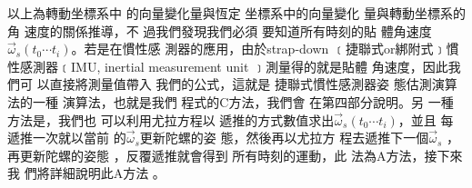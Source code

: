 \documentclass[12pt,twoside]{article}
\begin{document}
\bigskip

以上為轉動坐標系中%
的向量變化量與恆定%
坐標系中的向量變化%
量與轉動坐標系的角%
速度的關係推導，不%
過我們發現我們必須%
要知道所有時刻的貼%
體角速度$\vec{\omega}_{s}\left( t_{0}\cdots
t_{i}\right) $。若是在慣性感%
測器的應用，由於strap-down%
﹝捷聯式or綁附式﹞慣%
性感測器﹝IMU, inertial measurement unit%
﹞測量得的就是貼體%
角速度，因此我們可%
以直接將測量值帶入%
我們的公式，這就是%
捷聯式慣性感測器姿%
態估測演算法的一種%
演算法，也就是我們%
程式的C方法，我們會%
在第四部分說明。另%
一種方法是，我們也%
可以利用尤拉方程以%
遞推的方式數值求出$%
\vec{\omega}_{s}\left( t_{0}\cdots t_{i}\right) $，並且%
每遞推一次就以當前%
的$\vec{\omega}_{s}$更新陀螺的姿%
態，然後再以尤拉方%
程去遞推下一個$\vec{\omega}_{s}$%
，再更新陀螺的姿態%
，反覆遞推就會得到%
所有時刻的運動，此%
法為A方法，接下來我%
們將詳細說明此A方法%
。

\bigskip
\end{document}
